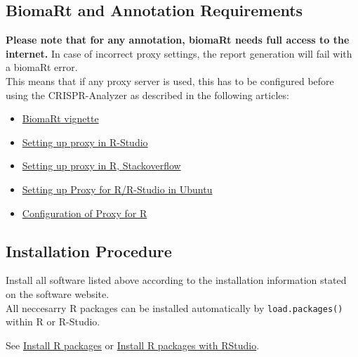 \documentclass[]{article}
\providecommand{\tightlist}{%
  \setlength{\itemsep}{0pt}\setlength{\parskip}{0pt}}
\begin{document}
\subsection{BiomaRt and Annotation
Requirements}\label{biomart-and-annotation-requirements}

\textbf{Please note that for any annotation, biomaRt needs full access
to the internet.} In case of incorrect proxy settings, the report
generation will fail with a biomaRt error.\\
This means that if any proxy server is used, this has to be configured
before using the CRISPR-Analyzer as described in the following articles:

\begin{itemize}
\tightlist
\item
  \href{http://www.bioconductor.org/packages/release/bioc/vignettes/biomaRt/inst/doc/biomaRt.pdf}{BiomaRt
  vignette}
\item
  \href{https://support.rstudio.com/hc/en-us/articles/200488488-Configuring-R-to-Use-an-HTTP-Proxy}{Setting
  up proxy in R-Studio}
\item
  \href{http://stackoverflow.com/questions/6467277/proxy-setting-for-r}{Setting
  up proxy in R, Stackoverflow}
\item
  \href{http://askubuntu.com/questions/572722/setting-up-the-proxy-for-rstudio}{Setting
  up Proxy for R/R-Studio in Ubuntu}
\item
  \href{https://bhoom.wordpress.com/2013/05/27/configuring-r-to-use-an-http-proxy-faq-knowledge-base-rstudio-support/}{Configuration
  of Proxy for R}
\end{itemize}

\subsection{Installation Procedure}\label{installation-procedure}

Install all software listed above according to the installation
information stated on the software website.\\
All neccesarry R packages can be installed automatically by
\texttt{load.packages()} within R or R-Studio.

See \href{http://www.r-bloggers.com/installing-r-packages/}{Install R
packages} or \href{https://www.youtube.com/watch?v=u1r5XTqrCTQ}{Install
R packages with RStudio}.
\end{document}
